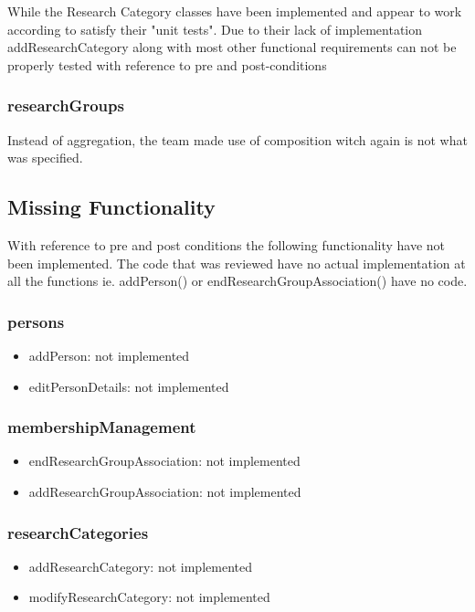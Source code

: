 \documentclass{article}
\begin{document}
		While the Research Category classes have been implemented and appear to work according to satisfy their "unit tests". Due to their lack of implementation addResearchCategory along with most other functional requirements can not be properly tested with reference to pre and post-conditions

		\subsubsection{researchGroups}

		Instead of aggregation, the team made use of composition witch again is not what was specified.


    \subsection{Missing Functionality}

    With reference to pre and post conditions the following functionality have not been implemented. The code that was reviewed have no actual implementation at all the functions ie. addPerson() or endResearchGroupAssociation() have no code.
	
		\subsubsection{persons} 
			\begin{itemize}
			\item addPerson: not implemented
			\item editPersonDetails: not implemented
			\end{itemize}

		\subsubsection{membershipManagement}
			\begin{itemize}
			\item endResearchGroupAssociation: not implemented
			\item addResearchGroupAssociation: not implemented
			\end{itemize}

		\subsubsection{researchCategories}
			\begin{itemize}
			\item addResearchCategory: not implemented
			\item modifyResearchCategory: not implemented
			\end{itemize}
\end{document}
